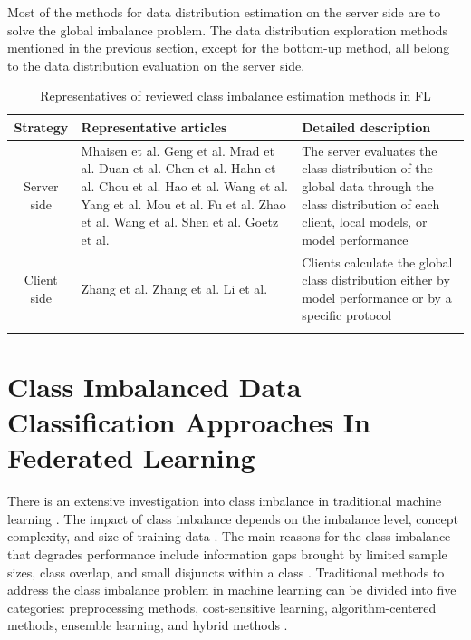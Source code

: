 \documentclass[10pt,journal,compsoc]{IEEEtran}
\providecommand{\DIFaddbeginFL}{} %
\providecommand{\DIFaddendFL}{} %
\newcommand{\DIFaddincludegraphics}[2][]{{\color{blue}\fbox{\DIFOincludegraphics[#1]{#2}}}} %
\DeclareRobustCommand{\DIFaddbeginFL}{\DIFOaddbeginFL \let\includegraphics\DIFaddincludegraphics} %
\DeclareRobustCommand{\DIFaddendFL}{\DIFOaddendFL \let\includegraphics\DIFOincludegraphics} %
\begin{document}
	Most of the methods for data distribution estimation on the server side are to solve the global imbalance problem. The data distribution exploration methods mentioned in the previous section, except for the bottom-up method, all belong to the data distribution evaluation on the server side.
	
	\begin{table}[htbp]
		\centering
		\caption{Representatives of reviewed class imbalance estimation methods in FL}	       		       	
		\begin{tabular}{cp{8.2cm}p{7.8cm}}
			\hline
			Strategy & Representative articles& Detailed description \\ 
			\hline
			Server side&Mhaisen et al. \cite{mhaisen2021optimal}
			Geng et al. \cite{geng2022bearing}
			Mrad et al. \cite{mrad2021federated}
			Duan et al. \cite{duan2019astraea} \cite{duan2020self} 
			Chen et al. \cite{chen2021novel}
			Hahn et al. \cite{hahn2019privacy}
			Chou et al. \cite{chou2022grp} 
			Hao et al. \cite{hao2021towards} 
			Wang et al. \cite{wang2021addressing} 
			Yang et al. \cite{yang2021federated}
			Mou et al. \cite{mou2021optimized}
			Fu et al.\cite{fu2021cic} 
			Zhao et al. \cite{zhao2020cluster} 
			Wang et al. \cite{wang2021adaptive} 
			Shen et al. \cite{shen2021agnostic}
			Goetz et al. \cite{goetz2019active}
			&The server evaluates the class distribution of the global data through the class distribution of each client, local models, or model performance\\ \hline
			Client side &	Zhang et al. \cite{zhang2021fedsens} 
			Zhang et al. \cite{zhang2021dubhe} 
			Li et al. \cite{li2021sample} &	Clients calculate the global class distribution either by model performance or by a specific protocol\\			 				
			\hline
			\DIFaddbeginFL \label{tab:class_estimation_server_or_client}
			\DIFaddendFL \end{tabular}
	\end{table}
	
	\section{Class Imbalanced Data Classification Approaches In Federated Learning}
	There is an extensive investigation into class imbalance in traditional machine learning \cite{guo2008class} \cite{ali2013classification}. The impact of class imbalance depends on the imbalance level, concept complexity, and size of training data \cite{japkowicz2002class}. The main reasons for the class imbalance that degrades performance include information gaps brought by limited sample sizes, class overlap, and small disjuncts within a class \cite{ali2013classification}. Traditional methods to address the class imbalance problem in machine learning can be divided into five categories: preprocessing methods, cost-sensitive learning, algorithm-centered methods, ensemble learning, and hybrid methods \cite{liu2008exploratory} \cite{xiao2021experimental}.
	
\end{document}
